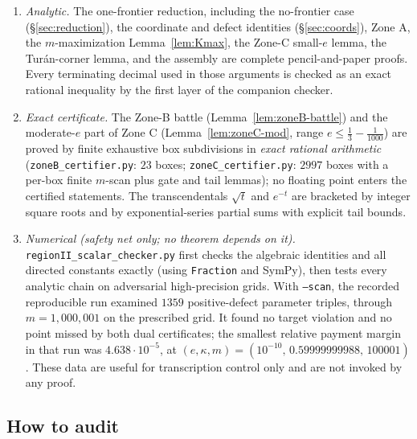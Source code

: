 \documentclass[11pt]{article}
\begin{document}
\begin{enumerate}[label=\textup{(\arabic*)}]
\item \emph{Analytic.}  The one-frontier reduction, including the
no-frontier case (\S\ref{sec:reduction}), the coordinate and defect identities
(\S\ref{sec:coords}), Zone A, the $m$-maximization
Lemma~\ref{lem:Kmax}, the Zone-C small-$e$ lemma, the Tur\'an-corner lemma, and
the assembly are complete pencil-and-paper proofs.  Every terminating decimal
used in those arguments is checked as an exact rational inequality by the
first layer of the companion checker.
\item \emph{Exact certificate.}  The Zone-B battle
(Lemma~\ref{lem:zoneB-battle}) and the moderate-$e$ part of Zone C
(Lemma~\ref{lem:zoneC-mod}, range $e\le\tfrac13-\tfrac1{1000}$) are proved by
finite exhaustive box subdivisions in \emph{exact rational arithmetic}
(\texttt{zoneB\_certifier.py}: $23$ boxes; \texttt{zoneC\_certifier.py}:
$2997$ boxes with a per-box finite $m$-scan plus gate and tail lemmas); no floating point enters the certified
statements.  The transcendentals $\sqrt t$ and $e^{-t}$ are bracketed by
integer square roots and by exponential-series partial sums with explicit
tail bounds.
\item \emph{Numerical (safety net only; no theorem depends on it).}
\texttt{regionII\_scalar\_checker.py} first checks the algebraic identities
and all directed constants exactly (using \texttt{Fraction} and SymPy), then
tests every analytic chain on adversarial high-precision grids.  With
\texttt{--scan}, the recorded reproducible run examined $1359$
positive-defect parameter triples, through $m=1{,}000{,}001$ on the prescribed grid.
It found no target violation and no point missed by both dual certificates;
the smallest relative payment margin in that run was
$4.638\cdot10^{-5}$, at
$(e,\kappa,m)=(10^{-10},\,0.59999999988,\,100001)$.  These data are useful for
transcription control only and are not invoked by any proof.
\end{enumerate}

\subsection*{How to audit}
\end{document}

